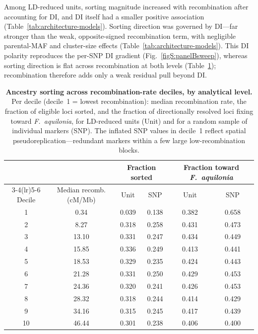\documentclass[11pt]{article}
\newcommand{\Faq}{\textit{F.~aquilonia}}
\begin{document}
Among LD-reduced units, sorting magnitude increased with recombination after accounting for DI, and DI itself had a smaller positive association (Table~\ref{tab:architecture-models}). Sorting direction was governed by DI—far stronger than the weak, opposite-signed recombination term, with negligible parental-MAF and cluster-size effects (Table~\ref{tab:architecture-models}). This DI polarity reproduces the per-SNP DI gradient (Fig.~\ref{figS:panelBsweep}), whereas sorting direction is flat across recombination at both levels (Table~\ref{tabS:sorting_by_level}); recombination therefore adds only a weak residual pull beyond DI.

\begin{table}[h]
\centering
\caption{\textbf{Ancestry sorting across recombination-rate deciles, by
analytical level.} Per decile (decile~1 = lowest recombination): median
recombination rate, the fraction of eligible loci sorted, and the fraction of
directionally resolved loci fixing toward \Faq{}, for LD-reduced units (Unit) and for a random sample of individual markers (SNP). The inflated SNP values in decile~1 reflect spatial pseudoreplication---redundant markers within a few large low-recombination blocks.}
\label{tabS:sorting_by_level}
\begin{tabular}{cccccc}
\toprule
 & & \multicolumn{2}{c}{Fraction sorted} & \multicolumn{2}{c}{Fraction toward \Faq{}} \\
\cmidrule(lr){3-4}\cmidrule(lr){5-6}
Decile & Median recomb. (cM/Mb) & Unit & SNP & Unit & SNP \\
\midrule
1 & 0.34 & 0.039 & 0.138 & 0.382 & 0.658 \\
2 & 8.27 & 0.318 & 0.258 & 0.431 & 0.473 \\
3 & 13.10 & 0.331 & 0.247 & 0.434 & 0.449 \\
4 & 15.85 & 0.336 & 0.249 & 0.413 & 0.441 \\
5 & 18.53 & 0.329 & 0.235 & 0.424 & 0.443 \\
6 & 21.28 & 0.331 & 0.250 & 0.429 & 0.453 \\
7 & 24.36 & 0.320 & 0.241 & 0.426 & 0.453 \\
8 & 28.32 & 0.318 & 0.244 & 0.414 & 0.429 \\
9 & 34.16 & 0.315 & 0.245 & 0.417 & 0.439 \\
10 & 46.44 & 0.301 & 0.238 & 0.406 & 0.400 \\
\bottomrule
\end{tabular}
\end{table}
\end{document}
